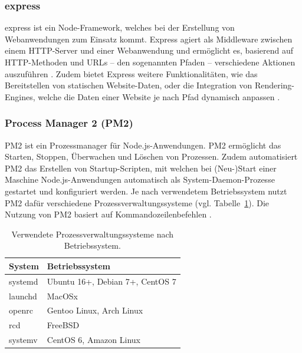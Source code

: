 \subsubsection{express}
\glqq{}express\grqq{} ist ein Node-Framework, welches bei der Erstellung von Webanwendungen zum Einsatz kommt. Express agiert als Middleware zwischen einem \acs{HTTP}-Server und einer Webanwendung und ermöglicht es, basierend auf \acs{HTTP}-Methoden und \acf{URL}s -- den sogenannten \glqq{}Pfaden\grqq{} -- verschiedene Aktionen auszuführen \cite{exp}. Zudem bietet Express weitere Funktionalitäten, wie das Bereitstellen von statischen Website-Daten, oder die Integration von \glqq{}Rendering-Engines\grqq{}, welche die Daten einer Website je nach Pfad dynamisch anpassen \cite{exp}.

\subsubsection{Process Manager 2 (PM2)}
\glqq{}PM2\grqq{} ist ein Prozessmanager für Node.js-Anwendungen. PM2 ermöglicht das Starten, Stoppen, Überwachen und Löschen von Prozessen. Zudem automatisiert PM2 das Erstellen von Startup-Scripten, mit welchen bei (Neu-)Start einer Maschine Node.js-Anwendungen automatisch als System-Daemon-Prozesse gestartet und konfiguriert werden. Je nach verwendetem Betriebssystem nutzt PM2 dafür verschiedene Prozessverwaltungssysteme (vgl. Tabelle~\ref{table:pm2systems}). Die Nutzung von PM2 basiert auf Kommandozeilenbefehlen \cite{pm2}.

\begin{table}[ht]
\centering
\begin{tabularx}{25em}{lX}
\toprule
System&Betriebssystem\\

\midrule
systemd&Ubuntu 16+, Debian 7+, CentOS 7\\
launchd&MacOSx\\
openrc&Gentoo Linux, Arch Linux\\
rcd&FreeBSD\\
systemv&CentOS 6, Amazon Linux\\
\bottomrule

\end{tabularx}
\caption{Verwendete Prozessverwaltungssysteme nach Betriebssystem.}
\label{table:pm2systems}
\end{table}